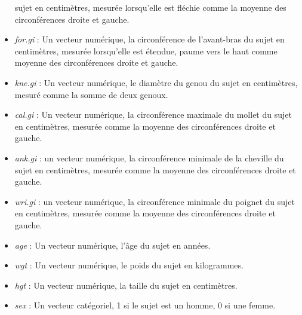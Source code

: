 \documentclass[
]{article}
\begin{document}
\begin{itemize}
  sujet en centimètres, mesurée lorsqu'elle est fléchie comme la moyenne
  des circonférences droite et gauche.
\item
  \emph{for.gi} : Un vecteur numérique, la circonférence de l'avant-bras
  du sujet en centimètres, mesurée lorsqu'elle est étendue, paume vers
  le haut comme moyenne des circonférences droite et gauche.
\item
  \emph{kne.gi} : Un vecteur numérique, le diamètre du genou du sujet en
  centimètres, mesuré comme la somme de deux genoux.
\item
  \emph{cal.gi} : Un vecteur numérique, la circonférence maximale du
  mollet du sujet en centimètres, mesurée comme la moyenne des
  circonférences droite et gauche.
\item
  \emph{ank.gi} : un vecteur numérique, la circonférence minimale de la
  cheville du sujet en centimètres, mesurée comme la moyenne des
  circonférences droite et gauche.
\item
  \emph{wri.gi} : un vecteur numérique, la circonférence minimale du
  poignet du sujet en centimètres, mesurée comme la moyenne des
  circonférences droite et gauche.
\item
  \emph{age} : Un vecteur numérique, l'âge du sujet en années.
\item
  \emph{wgt} : Un vecteur numérique, le poids du sujet en kilogrammes.
\item
  \emph{hgt} : Un vecteur numérique, la taille du sujet en centimètres.
\item
  \emph{sex} : Un vecteur catégoriel, 1 si le sujet est un homme, 0 si
  une femme.
\end{itemize}
\end{document}

